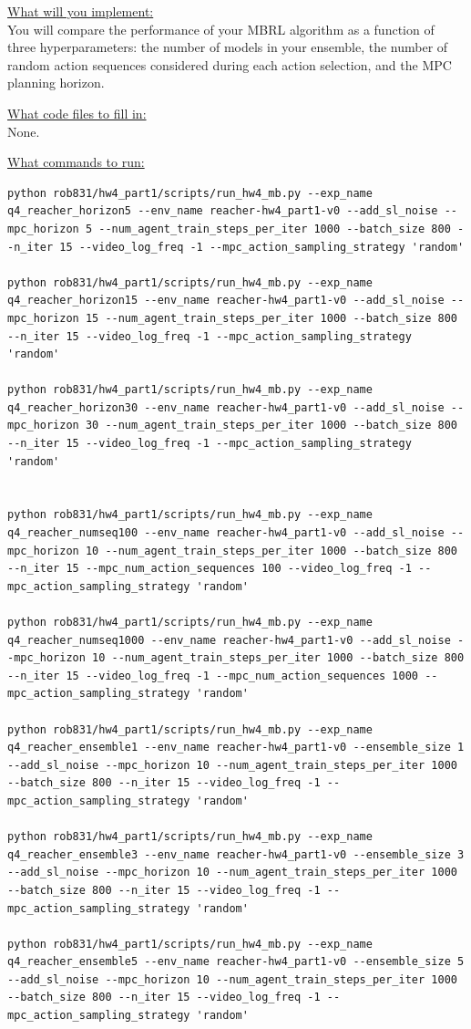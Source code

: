 \documentclass{article} %
\begin{document}
\underline{What will you implement:}\\
You will compare the performance of your MBRL algorithm as a function of three hyperparameters: the number of models in your ensemble, the number of random action sequences considered during each action selection, and the MPC planning horizon.

\underline{What code files to fill in:}\\
None.

\underline{What commands to run:}\\
\begin{lstlisting}[escapechar=@]
python rob831/hw4_part1/scripts/run_hw4_mb.py --exp_name q4_reacher_horizon5 --env_name reacher-hw4_part1-v0 --add_sl_noise --mpc_horizon 5 --num_agent_train_steps_per_iter 1000 --batch_size 800 --n_iter 15 --video_log_freq -1 --mpc_action_sampling_strategy 'random'

python rob831/hw4_part1/scripts/run_hw4_mb.py --exp_name q4_reacher_horizon15 --env_name reacher-hw4_part1-v0 --add_sl_noise --mpc_horizon 15 --num_agent_train_steps_per_iter 1000 --batch_size 800 --n_iter 15 --video_log_freq -1 --mpc_action_sampling_strategy 'random'

python rob831/hw4_part1/scripts/run_hw4_mb.py --exp_name q4_reacher_horizon30 --env_name reacher-hw4_part1-v0 --add_sl_noise --mpc_horizon 30 --num_agent_train_steps_per_iter 1000 --batch_size 800 --n_iter 15 --video_log_freq -1 --mpc_action_sampling_strategy 'random'


python rob831/hw4_part1/scripts/run_hw4_mb.py --exp_name q4_reacher_numseq100 --env_name reacher-hw4_part1-v0 --add_sl_noise --mpc_horizon 10 --num_agent_train_steps_per_iter 1000 --batch_size 800 --n_iter 15 --mpc_num_action_sequences 100 --video_log_freq -1 --mpc_action_sampling_strategy 'random'

python rob831/hw4_part1/scripts/run_hw4_mb.py --exp_name q4_reacher_numseq1000 --env_name reacher-hw4_part1-v0 --add_sl_noise --mpc_horizon 10 --num_agent_train_steps_per_iter 1000 --batch_size 800 --n_iter 15 --video_log_freq -1 --mpc_num_action_sequences 1000 --mpc_action_sampling_strategy 'random'

python rob831/hw4_part1/scripts/run_hw4_mb.py --exp_name q4_reacher_ensemble1 --env_name reacher-hw4_part1-v0 --ensemble_size 1 --add_sl_noise --mpc_horizon 10 --num_agent_train_steps_per_iter 1000 --batch_size 800 --n_iter 15 --video_log_freq -1 --mpc_action_sampling_strategy 'random'

python rob831/hw4_part1/scripts/run_hw4_mb.py --exp_name q4_reacher_ensemble3 --env_name reacher-hw4_part1-v0 --ensemble_size 3 --add_sl_noise --mpc_horizon 10 --num_agent_train_steps_per_iter 1000 --batch_size 800 --n_iter 15 --video_log_freq -1 --mpc_action_sampling_strategy 'random'

python rob831/hw4_part1/scripts/run_hw4_mb.py --exp_name q4_reacher_ensemble5 --env_name reacher-hw4_part1-v0 --ensemble_size 5 --add_sl_noise --mpc_horizon 10 --num_agent_train_steps_per_iter 1000 --batch_size 800 --n_iter 15 --video_log_freq -1 --mpc_action_sampling_strategy 'random'
\end{lstlisting}
\end{document}
